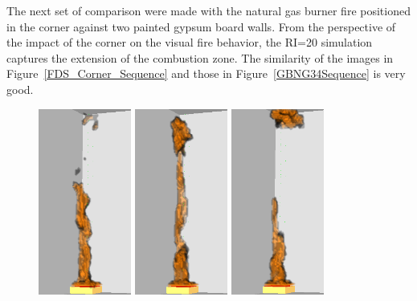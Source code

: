 \documentclass[twoside]{uocthesis}
\begin{document}
{The next set of comparison were made with the natural gas burner fire positioned in the corner against two painted gypsum board walls. From the perspective of the impact of the corner on the visual fire behavior, the RI=20 simulation captures the extension of the combustion zone.  The similarity of the images in Figure~\ref{FDS_Corner_Sequence} and those in Figure~\ref{GBNG34Sequence} is very good.     

\begin{figure}[p]
	\includegraphics[width=1.2in]{../Figures/FDSNG_Corner1}
	\includegraphics[width=1.2in]{../Figures/FDSNG_Corner2}
	\includegraphics[width=1.2in]{../Figures/FDSNG_Corner3} \\


\end{figure}}
\end{document}
